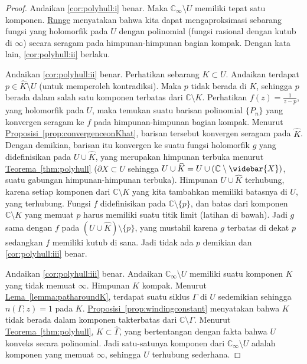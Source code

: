 \documentclass[12pt,openany]{book}
\newcommand{\C}{{\mathbb{C}}}
\theoremstyle{plain}
\theoremstyle{remark}
\theoremstyle{definition}
\theoremstyle{exercise}
\theoremstyle{example}
\newcommand{\thmref}[1]{\hyperref[#1]{Teorema~\ref*{#1}}}
\newcommand{\propref}[1]{\hyperref[#1]{Proposisi~\ref*{#1}}}
\newcommand{\lemmaref}[1]{\hyperref[#1]{Lema~\ref*{#1}}}
\begin{document}
\begin{proof}
Andaikan \ref{cor:polyhull:i} benar.
Maka $\C_\infty \setminus U$ memiliki tepat satu komponen.
\hyperref[cor:rungeseq]{Runge} menyatakan bahwa kita dapat mengaproksimasi sebarang fungsi
yang holomorfik pada $U$ dengan polinomial
(fungsi rasional dengan kutub di $\infty$) secara seragam pada himpunan-himpunan bagian kompak.
Dengan kata lain, \ref{cor:polyhull:ii} berlaku.

Andaikan \ref{cor:polyhull:ii} benar.
Perhatikan sebarang $K \subset U$.  Andaikan terdapat $p \in \widehat{K} \setminus U$
(untuk memperoleh kontradiksi).
Maka $p$ tidak berada di $K$, sehingga $p$ berada dalam salah satu komponen terbatas dari $\C \setminus K$.
Perhatikan $f(z) = \frac{1}{z-p}$, yang holomorfik pada $U$, maka temukan
suatu barisan polinomial $\{ P_n \}$ yang konvergen seragam ke $f$ pada himpunan-himpunan
bagian kompak.
Menurut \propref{prop:convergenceonKhat},
barisan tersebut konvergen seragam pada $\widehat{K}$.
Dengan demikian, barisan itu konvergen ke suatu fungsi holomorfik
$g$ yang didefinisikan pada $U \cup \widehat{K}$,
yang merupakan himpunan terbuka menurut \thmref{thm:polyhull}
($\partial X \subset U$ sehingga $U \cup \widehat{K} = U \cup (\C \setminus
\widebar{X})$, suatu gabungan himpunan-himpunan terbuka).
Himpunan $U \cup \widehat{K}$ terhubung, karena setiap komponen
dari $\C \setminus K$ yang kita tambahkan memiliki batasnya di $U$, yang terhubung.
Fungsi $f$ didefinisikan pada $\C \setminus \{ p \}$,
dan batas dari komponen $\C \setminus K$ yang memuat $p$ harus
memiliki suatu titik limit (latihan di bawah).
Jadi $g$ sama dengan $f$ pada $(U \cup \widehat{K}) \setminus \{ p \}$, yang
mustahil karena $g$ terbatas di dekat $p$ sedangkan $f$ memiliki kutub di sana.  Jadi tidak ada
$p$ demikian dan \ref{cor:polyhull:iii} benar.

Andaikan \ref{cor:polyhull:iii} benar.  Andaikan $\C_\infty \setminus U$
memiliki suatu komponen $K$ yang tidak memuat $\infty$.  Himpunan $K$ kompak.
Menurut \lemmaref{lemma:patharoundK}, terdapat suatu siklus $\Gamma$ 
di $U$ sedemikian sehingga $n(\Gamma;z) = 1$ pada $K$.
\propref{prop:windingconstant} menyatakan bahwa
$K$ tidak berada dalam komponen takterbatas dari $\C \setminus \Gamma$.
Menurut \thmref{thm:polyhull},
$K \subset \widehat{\Gamma}$,
yang bertentangan dengan fakta bahwa $U$ konveks secara polinomial.  Jadi satu-satunya komponen dari $\C_\infty
\setminus U$ adalah komponen yang memuat $\infty$, sehingga $U$ terhubung
sederhana.
\end{proof}
\end{document}
